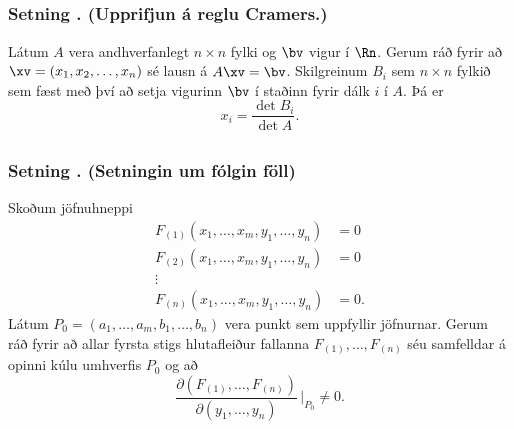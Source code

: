 \subsection{} 

\subsubsection{Setning \kaflanr.  (Upprifjun á reglu Cramers.)}

 Látum $A$ vera andhverfanlegt
$n\times n$ fylki og $\bv$ vigur í $\Rn$.  Gerum ráð fyrir að
$\xv=(x_1, x_2, \ldots, x_n)$ sé lausn á $A\xv=\bv$.  Skilgreinum
$B_i$ sem $n\times n$ fylkið sem fæst með því að setja vigurinn $\bv$
í staðinn fyrir dálk $i$ í $A$.  Þá er
$$x_i=\frac{\det B_i}{\det A}.$$





\subsection{} 

\subsubsection{Setning \kaflanr. (Setningin um fólgin föll)}
Skoðum jöfnuhneppi
\begin{align*}
F_{(1)}(x_1,\ldots,x_m, y_1, \ldots, y_n)&=0\\
F_{(2)}(x_1,\ldots,x_m, y_1, \ldots, y_n)&=0\\
\vdots\\
F_{(n)}(x_1,\ldots,x_m, y_1, \ldots, y_n)&=0.
\end{align*}
Látum $P_0=(a_1,\ldots, a_m, b_1,\ldots, b_n)$ vera punkt sem uppfyllir
jöfnurnar.   
Gerum ráð fyrir að allar fyrsta stigs
hlutafleiður fallanna $F_{(1)},\ldots, F_{(n)}$ séu samfelldar á opinni kúlu umhverfis $P_0$ og að
$$\frac{\partial(F_{(1)}, \ldots, F_{(n)})}
{\partial( y_1, \ldots, y_n)}\,\bigg|_{P_0}\neq 0.$$


\subsection{}
